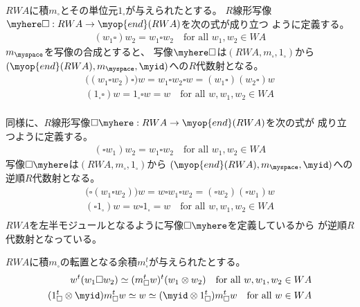 	$RWA$に積$m_\square$とその単位元$1_\square$が与えられたとする。
	$R$線形写像$\myhere\square:RWA\to\myop{end}(RWA)$を次の式が成り立つ
	ように定義する。
	\begin{equation*}\begin{split} %
		(w_1\square)w_2 = w_1\square w_2 \quad\text{for all }w_1,w_2\in WA
	\end{split}\end{equation*} %
	$m_\myspace$を写像の合成とすると、
	写像$\myhere\square$は$(RWA,m_\square,1_\square)$から
	$(\myop{end}(RWA),m_\myspace,\myid)$への$R$代数射となる。
	\begin{equation*}\begin{split} %
		\bigl((w_1\square w_2)\square\bigr)w
		= w_1\square w_2\square w
		= (w_1\square)(w_2\square)w \\
		(1_\square\square)w = 1_\square\square w = w
		\quad\text{for all }w,w_1,w_2\in WA \\
	\end{split}\end{equation*} %

	同様に、$R$線形写像$\square\myhere:RWA\to\myop{end}(RWA)$を次の式が
	成り立つように定義する。
	\begin{equation*}\begin{split} %
		(\square w_1)w_2 = w_1\square w_2
		\quad\text{for all }w_1,w_2\in WA
	\end{split}\end{equation*} %
	写像$\square\myhere$は$(RWA,m_\square,1_\square)$から
	$(\myop{end}(RWA),m_\myspace,\myid)$への逆順$R$代数射となる。
	\begin{equation*}\begin{split} %
		\bigl(\square(w_1\square w_2)\bigr)w
		= w\square w_1\square w_2
		= (\square w_2)(\square w_1)w \\
		(\square1_\square)w = w\square 1_\square = w
		\quad\text{for all }w,w_1,w_2\in WA \\
	\end{split}\end{equation*} %
	$RWA$を左半モジュールとなるように写像$\square\myhere$を定義しているから
	が逆順$R$代数射となっている。

	$RWA$に積$m_\square$の転置となる余積$m_\square^t$が与えられたとする。
	\begin{equation*}\begin{split} %
		w^t(w_1\square w_2) \simeq (m_\square^tw)^t(w_1\otimes w_2)
			\quad\text{for all }w,w_1,w_2\in WA \\
		(1_\square^t\otimes\myid)m_\square^tw
			\simeq w \simeq (\myid\otimes1_\square^t)m_\square^tw
			\quad\text{for all }w\in WA \\
	\end{split}\end{equation*} %

